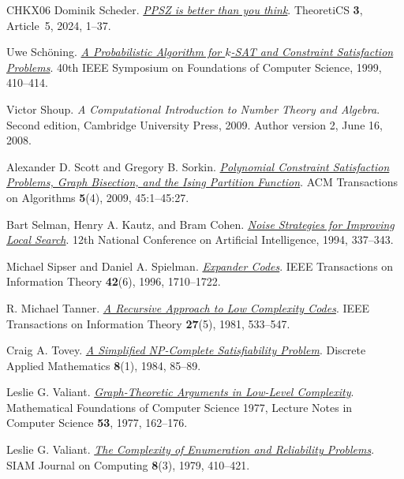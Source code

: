 \documentclass[11pt,reqno]{amsart}
\numberwithin{equation}{section}
\theoremstyle{definition}\newtheorem{definition}[theorem]{Definition}
\theoremstyle{remark}\newtheorem{remark}[theorem]{Remark}
\begin{document}
\begin{thebibliography}{CHKX06}
Dominik Scheder.
\href{https://doi.org/10.46298/theoretics.24.5}
{\emph{PPSZ is better than you think}}.
TheoretiCS \textbf{3}, Article~5, 2024, 1--37.

Uwe Sch\"oning.
\href{https://doi.org/10.1109/SFFCS.1999.814612}
{\emph{A Probabilistic Algorithm for $k$-SAT and Constraint Satisfaction
Problems}}.
40th IEEE Symposium on Foundations of Computer Science, 1999, 410--414.

Victor Shoup.
\emph{A Computational Introduction to Number Theory and Algebra}.
Second edition, Cambridge University Press, 2009.
Author version 2, June 16, 2008.

Alexander D. Scott and Gregory B. Sorkin.
\href{https://doi.org/10.1145/1597036.1597049}
{\emph{Polynomial Constraint Satisfaction Problems, Graph Bisection,
and the Ising Partition Function}}.
ACM Transactions on Algorithms \textbf{5}(4), 2009, 45:1--45:27.

Bart Selman, Henry A. Kautz, and Bram Cohen.
\href{https://cdn.aaai.org/AAAI/1994/AAAI94-051.pdf}
{\emph{Noise Strategies for Improving Local Search}}.
12th National Conference on Artificial Intelligence, 1994, 337--343.

Michael Sipser and Daniel A. Spielman.
\href{https://doi.org/10.1109/18.556667}
{\emph{Expander Codes}}.
IEEE Transactions on Information Theory \textbf{42}(6), 1996, 1710--1722.

R. Michael Tanner.
\href{https://doi.org/10.1109/TIT.1981.1056404}
{\emph{A Recursive Approach to Low Complexity Codes}}.
IEEE Transactions on Information Theory \textbf{27}(5), 1981, 533--547.

Craig A. Tovey.
\href{https://doi.org/10.1016/0166-218X(84)90081-7}
{\emph{A Simplified NP-Complete Satisfiability Problem}}.
Discrete Applied Mathematics \textbf{8}(1), 1984, 85--89.

Leslie G. Valiant.
\href{https://doi.org/10.1007/3-540-08353-7_135}
{\emph{Graph-Theoretic Arguments in Low-Level Complexity}}.
Mathematical Foundations of Computer Science 1977,
Lecture Notes in Computer Science \textbf{53}, 1977, 162--176.

Leslie G. Valiant.
\href{https://doi.org/10.1137/0208032}
{\emph{The Complexity of Enumeration and Reliability Problems}}.
SIAM Journal on Computing \textbf{8}(3), 1979, 410--421.


\end{thebibliography}
\end{document}
